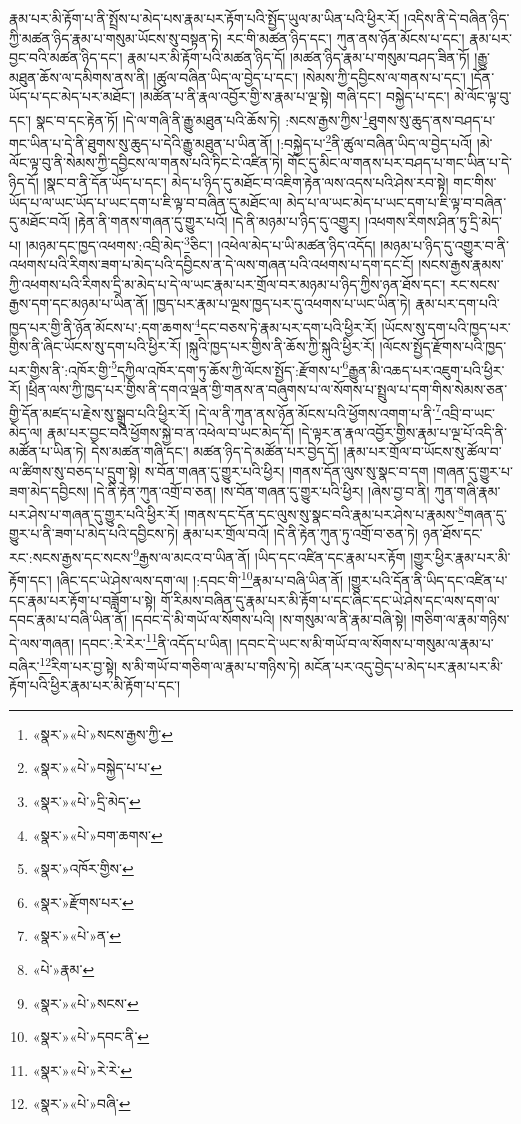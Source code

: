 རྣམ་པར་མི་རྟོག་པ་ནི་སྤྲོས་པ་མེད་པས་རྣམ་པར་རྟོག་པའི་སྤྱོད་ཡུལ་མ་ཡིན་པའི་ཕྱིར་རོ། །འདིས་ནི་དེ་བཞིན་ཉིད་ཀྱི་མཚན་ཉིད་རྣམ་པ་གསུམ་ཡོངས་སུ་བསྟན་ཏེ། རང་གི་མཚན་ཉིད་དང་། ཀུན་ནས་ཉོན་མོངས་པ་དང་། རྣམ་པར་བྱང་བའི་མཚན་ཉིད་དང་། རྣམ་པར་མི་རྟོག་པའི་མཚན་ཉིད་དོ། །མཚན་ཉིད་རྣམ་པ་གསུམ་བཤད་ཟིན་ཏོ། །རྒྱུ་མཐུན་ཆོས་ལ་དམིགས་ནས་ནི། །ཚུལ་བཞིན་ཡིད་ལ་བྱེད་པ་དང་། །སེམས་ཀྱི་དབྱིངས་ལ་གནས་པ་དང་། །དོན་ཡོད་པ་དང་མེད་པར་མཐོང་། །མཚོན་པ་ནི་རྣལ་འབྱོར་གྱི་ས་རྣམ་པ་ལྔ་སྟེ། གཞི་དང་། བསྐྱེད་པ་དང་། མེ་ལོང་ལྟ་བུ་དང་། སྣང་བ་དང་རྟེན་ཏོ། །དེ་ལ་གཞི་ནི་རྒྱུ་མཐུན་པའི་ཆོས་ཏེ། :སངས་རྒྱས་ཀྱིས་\footnote{«སྣར་»«པེ་»སངས་རྒྱས་ཀྱི་}ཐུགས་སུ་ཆུད་ནས་བཤད་པ་གང་ཡིན་པ་དེ་ནི་ཐུགས་སུ་ཆུད་པ་དེའི་རྒྱུ་མཐུན་པ་ཡིན་ནོ། །:བསྐྱེད་པ་\footnote{«སྣར་»«པེ་»བསྐྱེད་པ་པ་}ནི་ཚུལ་བཞིན་ཡིད་ལ་བྱེད་པའོ། །མེ་ལོང་ལྟ་བུ་ནི་སེམས་ཀྱི་དབྱིངས་ལ་གནས་པའི་ཏིང་ངེ་འཛིན་ཏེ། གོང་དུ་མིང་ལ་གནས་པར་བཤད་པ་གང་ཡིན་པ་དེ་ཉིད་དོ། །སྣང་བ་ནི་དོན་ཡོད་པ་དང་། མེད་པ་ཉིད་དུ་མཐོང་བ་འཇིག་རྟེན་ལས་འདས་པའི་ཤེས་རབ་སྟེ། གང་གིས་ཡོད་པ་ལ་ཡང་ཡོད་པ་ཡང་དག་པ་ཇི་ལྟ་བ་བཞིན་དུ་མཐོང་ལ། མེད་པ་ལ་ཡང་མེད་པ་ཡང་དག་པ་ཇི་ལྟ་བ་བཞིན་དུ་མཐོང་བའོ། །རྟེན་ནི་གནས་གཞན་དུ་གྱུར་པའོ། །དེ་ནི་མཉམ་པ་ཉིད་དུ་འགྱུར། །འཕགས་རིགས་ཤིན་ཏུ་དྲི་མེད་པ། །མཉམ་དང་ཁྱད་འཕགས་:འབྲི་མེད་\footnote{«སྣར་»«པེ་»དྲི་མེད་}ཅིང་། །འཕེལ་མེད་པ་ཡི་མཚན་ཉིད་འདོད། །མཉམ་པ་ཉིད་དུ་འགྱུར་བ་ནི་འཕགས་པའི་རིགས་ཟག་པ་མེད་པའི་དབྱིངས་ན་དེ་ལས་གཞན་པའི་འཕགས་པ་དག་དང་ངོ། །སངས་རྒྱས་རྣམས་ཀྱི་འཕགས་པའི་རིགས་དྲི་མ་མེད་པ་དེ་ལ་ཡང་རྣམ་པར་གྲོལ་བར་མཉམ་པ་ཉིད་ཀྱིས་ཉན་ཐོས་དང་། རང་སངས་རྒྱས་དག་དང་མཉམ་པ་ཡིན་ནོ། །ཁྱད་པར་རྣམ་པ་ལྔས་ཁྱད་པར་དུ་འཕགས་པ་ཡང་ཡིན་ཏེ། རྣམ་པར་དག་པའི་ཁྱད་པར་གྱི་ནི་ཉོན་མོངས་པ་:དག་ཆགས་\footnote{«སྣར་»«པེ་»བག་ཆགས་}དང་བཅས་ཏེ་རྣམ་པར་དག་པའི་ཕྱིར་རོ། །ཡོངས་སུ་དག་པའི་ཁྱད་པར་གྱིས་ནི་ཞིང་ཡོངས་སུ་དག་པའི་ཕྱིར་རོ། །སྐུའི་ཁྱད་པར་གྱིས་ནི་ཆོས་ཀྱི་སྐུའི་ཕྱིར་རོ། །ལོངས་སྤྱོད་རྫོགས་པའི་ཁྱད་པར་གྱིས་ནི་:འཁོར་གྱི་\footnote{«སྣར་»འཁོར་གྱིས་}དཀྱིལ་འཁོར་དག་ཏུ་ཆོས་ཀྱི་ལོངས་སྤྱོད་:རྫོགས་པ་\footnote{«སྣར་»རྫོགས་པར་}རྒྱུན་མི་འཆད་པར་འཇུག་པའི་ཕྱིར་རོ། །ཕྲིན་ལས་ཀྱི་ཁྱད་པར་གྱིས་ནི་དགའ་ལྡན་གྱི་གནས་ན་བཞུགས་པ་ལ་སོགས་པ་སྤྲུལ་པ་དག་གིས་སེམས་ཅན་གྱི་དོན་མཛད་པ་རྗེས་སུ་སྒྲུབ་པའི་ཕྱིར་རོ། །དེ་ལ་ནི་ཀུན་ནས་ཉོན་མོངས་པའི་ཕྱོགས་འགག་པ་ནི་\footnote{«སྣར་»«པེ་»ན་}འབྲི་བ་ཡང་མེད་ལ། རྣམ་པར་བྱང་བའི་ཕྱོགས་སྐྱེ་བ་ན་འཕེལ་བ་ཡང་མེད་དོ། །དེ་ལྟར་ན་རྣལ་འབྱོར་གྱིས་རྣམ་པ་ལྔ་པོ་འདི་ནི་མཚོན་པ་ཡིན་ཏེ། དེས་མཚན་གཞི་དང་། མཚན་ཉིད་དེ་མཚོན་པར་བྱེད་དོ། །རྣམ་པར་གྲོལ་བ་ཡོངས་སུ་ཚོལ་བ་ལ་ཚིགས་སུ་བཅད་པ་དྲུག་སྟེ། ས་བོན་གཞན་དུ་གྱུར་པའི་ཕྱིར། །གནས་དོན་ལུས་སུ་སྣང་བ་དག །གཞན་དུ་གྱུར་པ་ཟག་མེད་དབྱིངས། །དེ་ནི་རྟེན་ཀུན་འགྲོ་བ་ཅན། །ས་བོན་གཞན་དུ་གྱུར་པའི་ཕྱིར། །ཞེས་བྱ་བ་ནི། ཀུན་གཞི་རྣམ་པར་ཤེས་པ་གཞན་དུ་གྱུར་པའི་ཕྱིར་རོ། །གནས་དང་དོན་དང་ལུས་སུ་སྣང་བའི་རྣམ་པར་ཤེས་པ་རྣམས་\footnote{«པེ་»རྣམ་}གཞན་དུ་གྱུར་པ་ནི་ཟག་པ་མེད་པའི་དབྱིངས་ཏེ། རྣམ་པར་གྲོལ་བའོ། །དེ་ནི་རྟེན་ཀུན་ཏུ་འགྲོ་བ་ཅན་ཏེ། ཉན་ཐོས་དང་རང་:སངས་རྒྱས་དང་སངས་\footnote{«སྣར་»«པེ་»སངས་}རྒྱས་ལ་མངའ་བ་ཡིན་ནོ། །ཡིད་དང་འཛིན་དང་རྣམ་པར་རྟོག །གྱུར་ཕྱིར་རྣམ་པར་མི་རྟོག་དང་། །ཞིང་དང་ཡེ་ཤེས་ལས་དག་ལ། །:དབང་གི་\footnote{«སྣར་»«པེ་»དབང་ནི་}རྣམ་པ་བཞི་ཡིན་ནོ། །གྱུར་པའི་དོན་ནི་ཡིད་དང་འཛིན་པ་དང་རྣམ་པར་རྟོག་པ་བཟློག་པ་སྟེ། གོ་རིམས་བཞིན་དུ་རྣམ་པར་མི་རྟོག་པ་དང་ཞིང་དང་ཡེ་ཤེས་དང་ལས་དག་ལ་དབང་རྣམ་པ་བཞི་ཡིན་ནོ། །དབང་དེ་མི་གཡོ་ལ་སོགས་པའི། །ས་གསུམ་ལ་ནི་རྣམ་བཞི་སྟེ། །གཅིག་ལ་རྣམ་གཉིས་དེ་ལས་གཞན། །དབང་:རེ་རེར་\footnote{«སྣར་»«པེ་»རེ་རེ་}ནི་འདོད་པ་ཡིན། །དབང་དེ་ཡང་ས་མི་གཡོ་བ་ལ་སོགས་པ་གསུམ་ལ་རྣམ་པ་བཞིར་\footnote{«སྣར་»«པེ་»བཞི་}རིག་པར་བྱ་སྟེ། ས་མི་གཡོ་བ་གཅིག་ལ་རྣམ་པ་གཉིས་ཏེ། མངོན་པར་འདུ་བྱེད་པ་མེད་པར་རྣམ་པར་མི་རྟོག་པའི་ཕྱིར་རྣམ་པར་མི་རྟོག་པ་དང་། 
